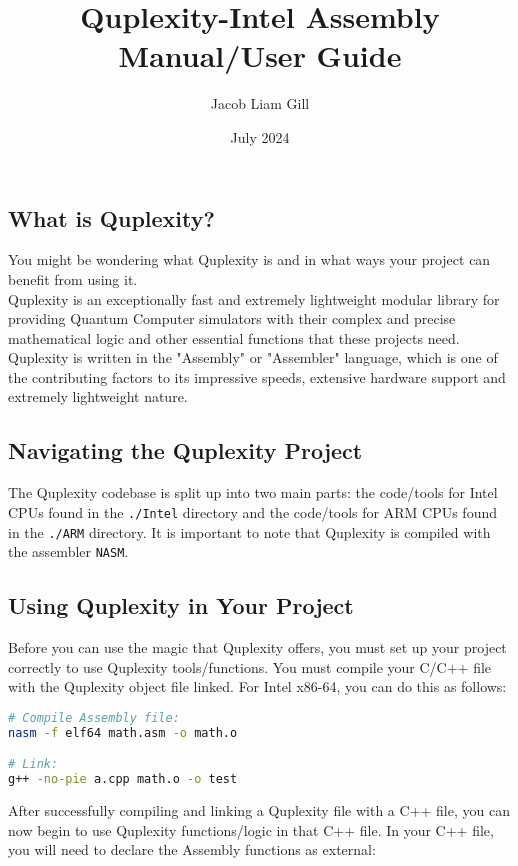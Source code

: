 \documentclass{article}
\title{Quplexity-Intel Assembly \\ Manual/User Guide}
\author{Jacob Liam Gill}
\date{July 2024}
\begin{document}
\maketitle

\subsection*{What is Quplexity?}
You might be wondering what Quplexity is and in what ways your project can benefit from using it. \\
Quplexity is an exceptionally fast and extremely lightweight modular library for providing Quantum Computer simulators with their complex and precise mathematical logic and other essential functions that these projects need.
Quplexity is written in the "Assembly" or "Assembler" language, which is one of the contributing factors to its impressive speeds, extensive hardware support and extremely lightweight nature.

\subsection*{Navigating the Quplexity Project}
The Quplexity codebase is split up into two main parts: the code/tools for Intel CPUs found in the \texttt{./Intel} directory and the code/tools for ARM CPUs found in the \texttt{./ARM} directory. It is important to note that Quplexity is compiled with the assembler \texttt{NASM}.

\subsection*{Using Quplexity in Your Project}
Before you can use the magic that Quplexity offers, you must set up your project correctly to use Quplexity tools/functions. You must compile your C/C++ file with the Quplexity object file linked. For Intel x86-64, you can do this as follows:

\begin{lstlisting}[language=bash, frame=single]
# Compile Assembly file:
nasm -f elf64 math.asm -o math.o

# Link:
g++ -no-pie a.cpp math.o -o test
\end{lstlisting}

\noindent After successfully compiling and linking a Quplexity file with a C++ file, you can now begin to use Quplexity functions/logic in that C++ file. In your C++ file, you will need to declare the Assembly functions as external:
\end{document}

